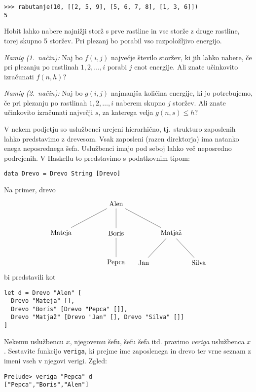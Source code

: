 \documentclass[arhiv]{../izpit}
\begin{document}
\begin{verbatim}>>> rabutanje(10, [[2, 5, 9], [5, 6, 7, 8], [1, 3, 6]])
5
\end{verbatim}
%
Hobit lahko nabere najnižji storž s prve rastline in vse storže z druge rastline, torej skupno 5 storžev. Pri plezanj bo porabil
vso razpoložljivo energijo.

\vspace{0.5\baselineskip}\noindent
\textit{Namig (1.\ način):} Naj bo $f(i, j)$ največje število storžev, ki jih lahko nabere, če pri plezanju po rastlinah $1, 2, \ldots, i$ porabi $j$
enot energije. Ali znate učinkovito izračunati $f(n, h)$? 

\vspace{0.5\baselineskip}\noindent
\textit{Namig (2.\ način):} Naj bo $g(i, j)$ najmanjša količina energije, ki jo potrebujemo, če pri plezanju po rastlinah $1, 2, \ldots, i$ naberem
skupno $j$ storžev. Ali znate učinkovito izračunati največji $s$, za katerega velja $g(n, s) \leq h$? 



V nekem podjetju so uslužbenci urejeni hierarhično, tj.\ strukturo zaposlenih lahko predstavimo z drevesom. Vsak zaposleni (razen
direktorja) ima natanko enega neposrednega šefa. Uslužbenci imajo pod seboj lahko več neposredno podrejenih. V Haskellu to
predstavimo s podatkovnim tipom:
\begin{verbatim}
data Drevo = Drevo String [Drevo]
\end{verbatim}
Na primer, drevo
\[
  \begin{tikzpicture}[sibling distance=8em]
    \node (d) {Alen}
      child {node {Mateja}}
      child {node {Boris}
        child {node {Pepca}}
      }
      child {node {Matjaž}
        child {node {Jan}}
        child {node {Silva}}
      }
    ;
  \end{tikzpicture}
\]
bi predstavili kot
\begin{verbatim}
let d = Drevo "Alen" [
  Drevo "Mateja" [],
  Drevo "Boris" [Drevo "Pepca" []],
  Drevo "Matjaž" [Drevo "Jan" [], Drevo "Silva" []]
]
\end{verbatim}

\podnaloga[10 točk]
Nekemu uslužbencu $x$, njegovemu šefu, šefu šefa itd. pravimo \emph{veriga} uslužbenca $x$.
Sestavite funkcijo %
\verb|veriga|, ki prejme ime zaposlenega in drevo ter vrne seznam z imeni vseh v njegovi verigi. Zgled:
\begin{verbatim}Prelude> veriga "Pepca" d
["Pepca","Boris","Alen"]
\end{verbatim}
\end{document}
